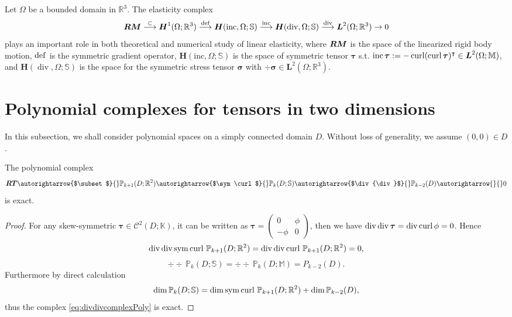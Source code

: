 Let $\Omega$ be a bounded domain in $\mathbb R^3$. The elasticity complex
\begin{equation}\label{eq:elasticitycomplex}
\boldsymbol{RM}\stackrel{\subset}{\longrightarrow} \boldsymbol  H^{1} (\Omega;\mathbb R^3) \stackrel{\operatorname{def}}{\longrightarrow} \boldsymbol  H(\mathrm{inc}, \Omega;\mathbb{S}) \stackrel{\text { inc }}{\longrightarrow} \boldsymbol  H(\operatorname{div}, \Omega; \mathbb{S}) \stackrel{\text { div }}{\longrightarrow} \boldsymbol  L^{2} (\Omega; \mathbb R^3)\rightarrow 0
\end{equation}
plays an important role in both theoretical and numerical study of linear elasticity, where $\boldsymbol{RM}$ is the space of the linearized rigid body motion, $\operatorname{def}$ is the symmetric gradient operator, $\boldsymbol   H(\mathrm{inc}, \Omega;\mathbb{S}) $ is the space of symmetric tensor $\boldsymbol  \tau$ s.t. $\operatorname{inc} \boldsymbol  \tau := - \operatorname{curl} (\operatorname{curl} \boldsymbol  \tau)^{\intercal}\in \boldsymbol  L^2(\Omega; \mathbb M)$, and  $\boldsymbol  H(\operatorname{div}, \Omega; \mathbb{S})$ is the space for the symmetric stress tensor $\boldsymbol  \sigma$ with $\div\boldsymbol  \sigma\in \boldsymbol  L^2(\Omega; \mathbb R^3)$.



\section{Polynomial complexes for tensors in two dimensions}

In this subsection, we shall consider polynomial spaces on a simply connected domain $D$. Without loss of generality, we assume $(0,0) \in D$.
\begin{lemma}
The polynomial complex
\begin{equation}\label{eq:divdivcomplexPoly}
\boldsymbol{RT}\autorightarrow{$\subset$}{} \mathbb P_{k+1}(D;\mathbb R^2)\autorightarrow{$\sym\curl$}{} \mathbb P_k(D;\mathbb S) \autorightarrow{$\div{\div}$}{} \mathbb P_{k-2}(D)\autorightarrow{}{}0
\end{equation}
is exact.
\end{lemma}
\begin{proof}
For any skew-symmetric $\boldsymbol \tau\in \mathcal C^2(D; \mathbb K)$, it can be written as $\boldsymbol \tau =
\begin{pmatrix}
 0 & \phi\\
 -\phi & 0
\end{pmatrix}
$, then we have $\operatorname{div}\operatorname{div}\boldsymbol \tau= \operatorname{div}\operatorname{curl}\phi = 0$. Hence
\[
\operatorname{div}\operatorname{div}\operatorname{sym}\operatorname{curl} \, \mathbb P_{k+1}(D;\mathbb R^2) = \operatorname{div}\operatorname{div}\operatorname{curl} \, \mathbb P_{k+1}(D;\mathbb R^2) = 0,
\]
\[
\div{\div}\, \mathbb P_k(D;\mathbb S)=\div{\div}\, \mathbb P_k(D;\mathbb M)=P_{k-2}(D).
\]
Furthermore by direct calculation
\[
\dim\mathbb P_k(D;\mathbb S)=\dim \operatorname{sym}\operatorname{curl} \, \mathbb P_{k+1}(D;\mathbb R^2)+\dim \mathbb P_{k-2}(D),
\]
thus the complex \eqref{eq:divdivcomplexPoly} is exact.
\end{proof}


